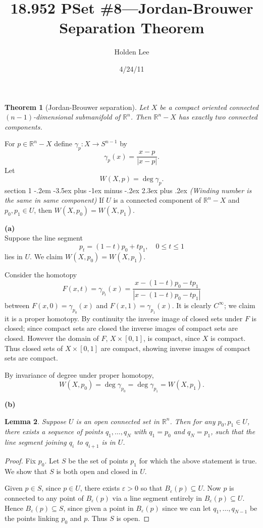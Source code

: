 \documentclass[12pt]{article}
\makeatletter
\theoremstyle{norm}
\newtheorem{thm}{Theorem}[section]
\newtheorem{lem}[thm]{Lemma}
\newcommand{\R}[0]{\mathbb{R}}
\newcommand{\subeq}[0]{\subseteq}
\newcommand{\ga}[0]{\gamma}
\newcommand{\ep}[0]{\varepsilon}
\newcommand{\ab}[1]{\left| {#1} \right|}
\newcommand{\subprob}[1]{\noindent\textbf{#1}\\}
\newcommand{\iy}[0]{\infty}
\newenvironment{problem}{\@startsection
       {section}
       {1}
       {-.2em}
       {-3.5ex plus -1ex minus -.2ex}
       {2.3ex plus .2ex}
       {\pagebreak[3]%
       \large\bf\noindent{Problem }
       }
       }
       {%
       }
\makeatother
\begin{document}
\title{18.952 PSet \#8---Jordan-Brouwer Separation Theorem}%
\author{Holden Lee}
\date{4/24/11}%
\maketitle
\thispagestyle{empty}
\begin{thm}[Jordan-Brouwer separation] Let $X$ be a compact oriented connected $(n-1)$-dimensional submanifold of $\R^n$. Then $\R^n-X$ has exactly two connected components.
\end{thm}
For $p\in \R^n-X$ define $\ga_p:X\to S^{n-1}$ by
\[
\ga_p(x)=\frac{x-p}{\ab{x-p}}.
\]
Let
\[
W(X,p)=\deg \ga_p.
\]
\begin{problem}{\it (Winding number is the same in same component)}
If $U$ is a connected component of $\R^n-X$ and $p_0,p_1\in U$, then $W(X,p_0)=W(X,p_1)$.

\subprob{(a)}
Suppose the line segment 
\[p_t=(1-t)p_0+tp_1,\quad 0\le t\le 1\]
lies in $U$. We claim $W(X,p_0)=W(X,p_1)$.

Consider the homotopy
\[
F(x,t)=\ga_{p_t}(x)=\frac{x-(1-t)p_0-tp_1}{|x-(1-t)p_0-tp_1|}
\]
between $F(x,0)=\ga_{p_0}(x)$ and $F(x,1)=\ga_{p_1}(x)$. It is clearly $C^{\iy}$; we claim it is a proper homotopy. By continuity the inverse image of closed sets under $F$ is closed; since compact sets are closed the inverse images of compact sets are closed. However the domain of $F$, $X\times[0,1]$, is compact, since $X$ is compact. Thus closed sets of $X\times [0,1]$ are compact, showing inverse images of compact sets are compact.

By invariance of degree under proper homotopy,
\[
W(X,p_0)=\deg \ga_{p_0}=\deg \ga_{p_1}=W(X,p_1).
\]

\subprob{(b)}
\begin{lem}\label{p8-1-l1}
Suppose $U$ is an open connected set in $\R^n$. Then for any $p_0,p_1\in U$, there exists a sequence of points $q_1,\ldots, q_N$ with $q_1=p_0$ and $q_N=p_1$, such that the line segment joining $q_i$ to $q_{i+1}$ is in $U$.
\end{lem}
\begin{proof}
%
Fix $p_0$. Let $S$ be the set of points $p_1$ for which the above statement is true. We show that $S$ is both open and closed in $U$.

Given $p\in S$, since $p\in U$, there exists $\ep>0$ so that $B_{\ep}(p)\subeq U$. Now $p$ is connected to any point of $B_{\ep}(p)$ via a line segment entirely in $B_{\ep}(p)\subeq U$. Hence $B_{\ep}(p)\subeq S$, since given a point in $B_{\ep}(p)$ since we can let $q_1,\ldots, q_{N-1}$ be the points linking $p_0$ and $p$. Thus $S$ is open.


\end{proof}
\end{problem}
\end{document}

